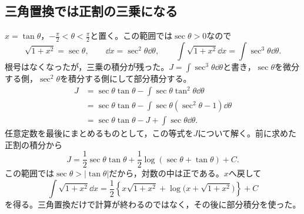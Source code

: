 \subsection{三角置換では正割の三乗になる}

$x=\tan\theta$，$-\frac\pi2<\theta<\frac\pi2$と置く。この範囲では$\sec\theta>0$なので
\[
\sqrt{1+x^2}=\sec\theta,\qquad
\dd x=\sec^2\theta\dd\theta,\qquad
\int\sqrt{1+x^2}\dd x=\int\sec^3\theta\dd\theta.
\]
根号はなくなったが，三乗の積分が残った。$J=\int\sec^3\theta\dd\theta$と書き，$\sec\theta$を微分する側，$\sec^2\theta$を積分する側にして部分積分する。
\[
\begin{aligned}
J&=\sec\theta\tan\theta
-\int\sec\theta\tan^2\theta\dd\theta\\
&=\sec\theta\tan\theta
-\int\sec\theta(\sec^2\theta-1)\dd\theta\\
&=\sec\theta\tan\theta-J+\int\sec\theta\dd\theta.
\end{aligned}
\]
任意定数を最後にまとめるものとして，この等式を$J$について解く。前に求めた正割の積分から
\[
J=\frac12\sec\theta\tan\theta
+\frac12\log(\sec\theta+\tan\theta)+C.
\]
この範囲では$\sec\theta>|\tan\theta|$だから，対数の中は正である。$x$へ戻して
\begin{equation}\label{式:一と二乗の根号積分}
\int\sqrt{1+x^2}\dd x
=\frac12\left\{x\sqrt{1+x^2}
+\log\bigl(x+\sqrt{1+x^2}\bigr)\right\}+C
\end{equation}
を得る。三角置換だけで計算が終わるのではなく，その後に部分積分を使った。

